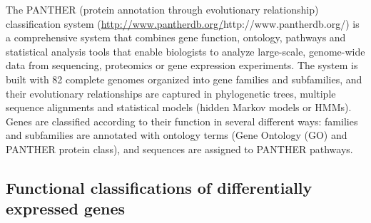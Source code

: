\begin{blockquote}
  The PANTHER (protein annotation through evolutionary relationship) classification system (\url{http://www.pantherdb.org/}{http://www.pantherdb.org/}) is a comprehensive system that combines gene function, ontology, pathways and statistical analysis tools that enable biologists to analyze large-scale, genome-wide data from sequencing, proteomics or gene expression experiments. The system is built with 82 complete genomes organized into gene families and subfamilies, and their evolutionary relationships are captured in phylogenetic trees, multiple sequence alignments and statistical models (hidden Markov models or HMMs). Genes are classified according to their function in several different ways: families and subfamilies are annotated with ontology terms (Gene Ontology (GO) and PANTHER protein class), and sequences are assigned to PANTHER pathways.
\end{blockquote}

\subsection{Functional classifications of differentially expressed genes}
\label{subsec:funct-class-diff}


\pagebreak






